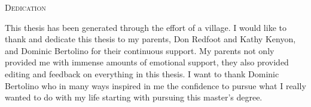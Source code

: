 \documentclass[12pt]{UIdahoMastersThesis}
\begin{document}
\newpage
 \vspace*{\fill}
 \begin{center}
   {\LARGE\textsc{Dedication}}

  This thesis has been generated through the effort of a village. I would like to thank and dedicate this thesis to my parents, Don Redfoot and Kathy Kenyon, and Dominic Bertolino for their continuous support. My parents not only provided me with immense amounts of emotional support, they also provided editing and feedback on everything in this thesis. I want to thank Dominic Bertolino who in many ways inspired in me the confidence to pursue what I really wanted to do with my life starting with pursuing this master's degree.
 \end{center}
 \vspace{\fill}
 \newpage

\tableofcontents

\newpage

\listoftables
\end{document}

